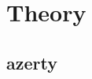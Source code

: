 \documentclass[../main.tex]{subfiles}
\begin{document}
\chapter{Theory}

\section{azerty}

\lipsum[2]
\end{document}
